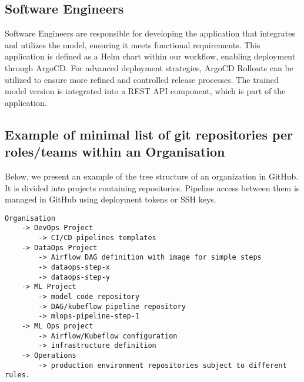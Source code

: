 \subsection{Software Engineers}
Software Engineers are responsible for developing the application that integrates and utilizes the model,
ensuring it meets functional requirements.
This application is defined as a Helm chart within our workflow, enabling deployment through ArgoCD.
For advanced deployment strategies, ArgoCD Rollouts can be utilized to ensure more refined and controlled release processes.
The trained model version is integrated into a REST API component, which is part of the application.

\subsection{Example of minimal list of git repositories per roles/teams within an Organisation}

Below, we present an example of the tree structure of an organization in GitHub.
It is divided into projects containing repositories.
Pipeline access between them is managed in GitHub using deployment tokens or SSH keys.

\begin{verbatim}
Organisation
    -> DevOps Project
        -> CI/CD pipelines templates
    -> DataOps Project
        -> Airflow DAG definition with image for simple steps
        -> dataops-step-x
        -> dataops-step-y
    -> ML Project
        -> model code repository
        -> DAG/kubeflow pipeline repository
        -> mlops-pipeline-step-1
    -> ML Ops project
        -> Airflow/Kubeflow configuration
        -> infrastructure definition
    -> Operations
        -> production environment repositories subject to different rules.
\end{verbatim}
